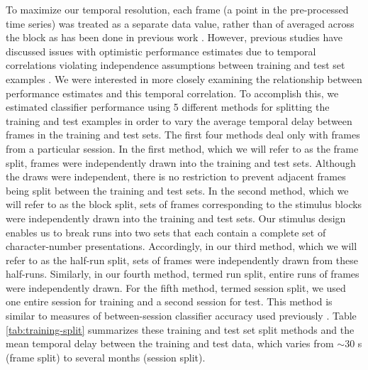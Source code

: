\documentclass[preprint,5p,authoryear]{elsarticle}
\begin{document}
To maximize our temporal resolution, each frame (a point in the pre-processed time series) was treated as a separate data value, rather than of averaged across the block as has been done in previous work \citep{BlockAveraging}.
However, previous studies have discussed issues with optimistic performance estimates due to temporal correlations violating independence assumptions between training and test set examples \citep{Pereira2009}.
We were interested in more closely examining the relationship between performance estimates and this temporal correlation.
To accomplish this, we estimated classifier performance using 5 different methods for splitting the training and test examples in order to vary the average temporal delay between frames in the training and test sets. 
The first four methods deal only with frames from a particular session.
In the first method, which we will refer to as the frame split, frames were independently drawn into the training and test sets. 
Although the draws were independent, there is no restriction to prevent adjacent frames being split between the training and test sets.
In the second method, which we will refer to as the block split, sets of frames corresponding to the stimulus blocks were independently drawn into the training and test sets.
Our stimulus design enables us to break runs into two sets that each contain a complete set of character-number presentations. 
Accordingly, in our third method, which we will refer to as the half-run split, sets of frames were independently drawn from these half-runs. 
Similarly, in our fourth method, termed run split, entire runs of frames were independently drawn. 
For the fifth method, termed session split, we used one entire session for training and a second session for test.
This method is similar to measures of between-session classifier accuracy used previously \citep{BetweenSessionAccuracy}.
Table \ref{tab:training-split} summarizes these training and test set split methods and the mean temporal delay between the training and test data, which varies from $\sim$30 s (frame split) to several months (session split).
\end{document}
